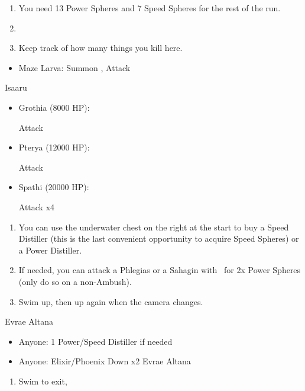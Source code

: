 \begin{enumerate}[resume]
    \item You need 13 Power Spheres and 7 Speed Spheres for the rest of the run.
    \item \save
    \item Keep track of how many things you kill here.
\end{enumerate}
\begin{encounters}
    \begin{itemize}
        \item Maze Larva: Summon \ixion, Attack
    \end{itemize}
\end{encounters}
\bothvfill
\winvfill
\lossvfill
\begin{battle}{Isaaru}
    \begin{itemize}
        \item Grothia (8000 HP):
        \begin{itemize}
            \summon{\bahamut}
            \bahamutf Attack
        \end{itemize}
        \item Pterya (12000 HP):
        \begin{itemize}
            \summon{\bahamut}
            \bahamutf Attack
        \end{itemize}
        \item Spathi (20000 HP):
        \begin{itemize}
            \summon{\ixion}
            \ixionf Attack x4
        \end{itemize}
    \end{itemize}
\end{battle}
\begin{enumerate}[resume]
    \item You can use the underwater chest on the right at the start to buy a Speed Distiller (this is the last convenient opportunity to acquire Speed Spheres) or a Power Distiller.
    \item If needed, you can attack a Phlegias or a Sahagin with \tidus\ for 2x Power Spheres (only do so on a non-Ambush).
    \item Swim up, then up again when the camera changes. 
\end{enumerate}
\begin{battle}{Evrae Altana}
    \begin{itemize}
        \item Anyone: 1 Power/Speed Distiller if needed
        \item Anyone: Elixir/Phoenix Down x2 Evrae Altana
    \end{itemize}
\end{battle}
\begin{enumerate}[resume]
    \item Swim to exit, \sd
\end{enumerate}
\ 
\bothvfill
\ \bothnewline
\bothcb
\ 

\bothnpsingle
